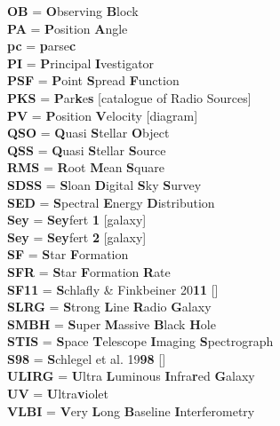 {\textbf{OB} = \textbf{O}bserving \textbf{B}lock \\
\textbf{PA} = \textbf{P}osition \textbf{A}ngle \\
\textbf{pc} = \textbf{p}arse\textbf{c} \\
\textbf{PI} = \textbf{P}rincipal \textbf{I}vestigator \\
\textbf{PSF} = \textbf{P}oint \textbf{S}pread \textbf{F}unction \\
\textbf{PKS} = \textbf{P}ar\textbf{k}e\textbf{s} [catalogue of Radio Sources] \\
\textbf{PV} = \textbf{P}osition \textbf{V}elocity [diagram] \\
\textbf{QSO} = \textbf{Q}uasi \textbf{S}tellar \textbf{O}bject \\
\textbf{QSS} = \textbf{Q}uasi \textbf{S}tellar \textbf{S}ource \\
\textbf{RMS} = \textbf{R}oot \textbf{M}ean \textbf{S}quare \\
\textbf{SDSS} = \textbf{S}loan \textbf{D}igital \textbf{S}ky \textbf{S}urvey \\
\textbf{SED} = \textbf{S}pectral \textbf{E}nergy \textbf{D}istribution \\
\textbf{Sey} = \textbf{Sey}fert \textbf{1} [galaxy] \\
\textbf{Sey} = \textbf{Sey}fert \textbf{2} [galaxy] \\
\textbf{SF} = \textbf{S}tar \textbf{F}ormation \\
\textbf{SFR} = \textbf{S}tar \textbf{F}ormation \textbf{R}ate \\
\textbf{SF11} = \textbf{S}chlafly \& Finkbeiner 20\textbf{11} [\citealt{Schlafly2011}] \\
\textbf{SLRG} = \textbf{S}trong \textbf{L}ine \textbf{R}adio \textbf{G}alaxy \\
\textbf{SMBH} = \textbf{S}uper \textbf{M}assive \textbf{B}lack \textbf{H}ole \\ 
\textbf{STIS} = \textbf{S}pace \textbf{T}elescope \textbf{I}maging \textbf{S}pectrograph \\
\textbf{S98} = \textbf{S}chlegel et al. 19\textbf{98} [\citealt{Schlegel1998}] \\
\textbf{ULIRG} = \textbf{U}ltra  \textbf{L}uminous \textbf{I}nfra\textbf{r}ed \textbf{G}alaxy \\
\textbf{UV} = \textbf{U}ltra\textbf{v}iolet \\
\textbf{VLBI} = \textbf{V}ery \textbf{L}ong \textbf{B}aseline \textbf{I}nterferometry \\
}
